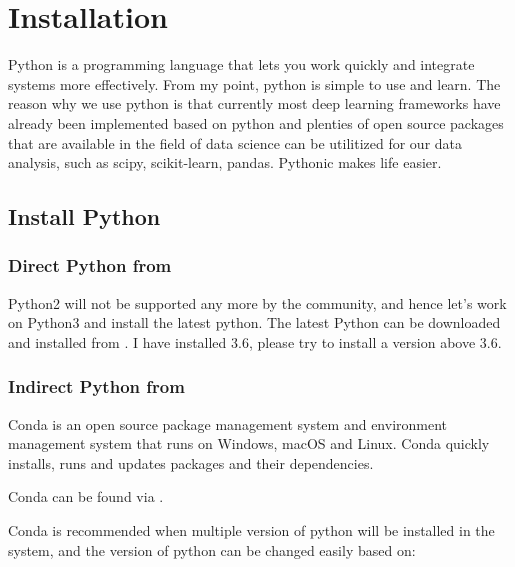 \documentclass[letterpaper,10pt,english]{sphinxmanual}
\begin{document}
\section{Installation}
\label{\detokenize{usage/installation:installation}}\label{\detokenize{usage/installation::doc}}
Python is a programming language that lets you work quickly
and integrate systems more effectively. From my point, python is simple to use and learn. The reason why we use python is that currently most deep learning frameworks have already been implemented based on python and plenties of open source packages that are available in the field of data science can be utilitized for our data analysis, such as scipy, scikit-learn, pandas. Pythonic makes life easier.


\subsection{Install Python}
\label{\detokenize{usage/installation:install-python}}

\subsubsection{Direct Python from }
\label{\detokenize{usage/installation:direct-python-from-python}}
Python2 will not be supported any more by the community, and hence let’s work on Python3 and install the latest python.
The latest Python can be downloaded and installed from  . I have installed 3.6, please try to install a version above 3.6.


\subsubsection{Indirect Python from }
\label{\detokenize{usage/installation:indirect-python-from-conda}}
Conda is an open source package management system and environment management system that runs on Windows, macOS and Linux. Conda quickly installs, runs and updates packages and their dependencies.

Conda can be found via .

Conda is recommended when multiple version of python will be installed in the system, and the version of python can be changed easily based on:

%
\begin{sphinxVerbatim}[commandchars=\\\{\}]
\end{sphinxVerbatim}
\end{document}
